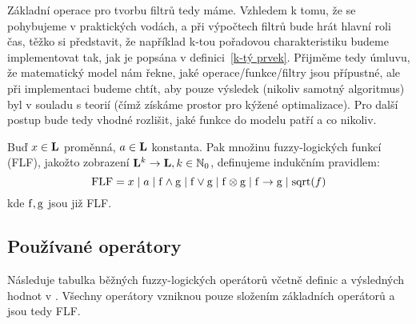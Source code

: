     Základní operace pro tvorbu filtrů tedy máme. Vzhledem k tomu, že se pohybujeme v praktických vodách, a při výpočtech filtrů bude hrát hlavní roli čas, těžko si představit, že například k-tou pořadovou charakteristiku budeme implementovat tak, jak je popsána v definici~\ref{k-tý prvek}. Přijměme tedy úmluvu, že matematický model nám řekne, jaké operace/funkce/filtry jsou přípustné, ale při implementaci budeme chtít, aby pouze výsledek (nikoliv samotný algoritmus) byl v souladu s teorií (čímž získáme prostor pro kýžené optimalizace). Pro další postup bude tedy vhodné rozlišit, jaké funkce do modelu patří a co nikoliv.

    \begin{define}\label{def FLF}
    Buď $x \in \mathbf{L}$ proměnná, $a \in \mathbf{L}$ konstanta. Pak množinu fuzzy-logických funkcí \textup{(FLF)}, jakožto zobrazení $\mathbf{L}^k \rightarrow \mathbf{L}, k \in \mathbb{N}_0$, definujeme indukčním pravidlem:
    \[
    \mathrm{FLF} = x \mid a \mid \mathrm{f} \wedge \mathrm{g} \mid \mathrm{f} \vee \mathrm{g} \mid \mathrm{f} \otimes \mathrm{g} \mid \mathrm{f} \rightarrow \mathrm{g} \mid \mathrm{sqrt}(f)
    \]
    kde $\mathrm{f},\mathrm{g}$ jsou již \textup{FLF}.
    \end{define}

    \subsection{Používané operátory}\label{operátory}

    Následuje tabulka běžných fuzzy-logických operátorů včetně definic a výsledných hodnot v \LAsq. Všechny operátory vzniknou pouze složením základních operátorů a jsou tedy FLF.

